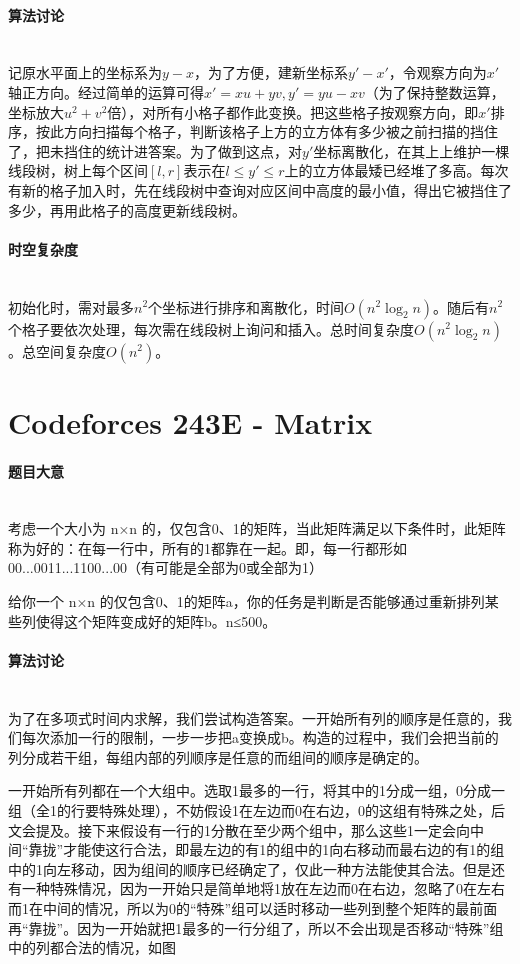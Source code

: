 \documentclass[UTF8]{ctexart}
\newcommand{\myparagraph}[1]{\paragraph{#1}\mbox{}\\}
\theoremstyle{nonumberplain}
\begin{document}
		\myparagraph{算法讨论}
		
			记原水平面上的坐标系为$y-x$，为了方便，建新坐标系$y'-x'$，令观察方向为$x'$轴正方向。经过简单的运算可得$x'=xu+yv, y'=yu-xv$（为了保持整数运算，坐标放大$u^2+v^2$倍），对所有小格子都作此变换。把这些格子按观察方向，即$x'$排序，按此方向扫描每个格子，判断该格子上方的立方体有多少被之前扫描的挡住了，把未挡住的统计进答案。为了做到这点，对$y'$坐标离散化，在其上上维护一棵线段树，树上每个区间$[l,r]$表示在$l \leq y' \leq r$上的立方体最矮已经堆了多高。每次有新的格子加入时，先在线段树中查询对应区间中高度的最小值，得出它被挡住了多少，再用此格子的高度更新线段树。
		
		\myparagraph{时空复杂度}
		
			初始化时，需对最多$n^2$个坐标进行排序和离散化，时间$O(n^2\log_2n)$。随后有$n^2$个格子要依次处理，每次需在线段树上询问和插入。总时间复杂度$O(n^2\log_2n)$。总空间复杂度$O(n^2)$。
	
	\section{Codeforces 243E - Matrix}
	
		\myparagraph{题目大意}
		
			考虑一个大小为 n×n 的，仅包含0、1的矩阵，当此矩阵满足以下条件时，此矩阵称为好的：在每一行中，所有的1都靠在一起。即，每一行都形如00...0011...1100...00（有可能是全部为0或全部为1）
		
			给你一个 n×n 的仅包含0、1的矩阵a，你的任务是判断是否能够通过重新排列某些列使得这个矩阵变成好的矩阵b。n≤500。
			
		\myparagraph{算法讨论}
		
			为了在多项式时间内求解，我们尝试构造答案。一开始所有列的顺序是任意的，我们每次添加一行的限制，一步一步把a变换成b。构造的过程中，我们会把当前的列分成若干组，每组内部的列顺序是任意的而组间的顺序是确定的。
		
			一开始所有列都在一个大组中。选取1最多的一行，将其中的1分成一组，0分成一组（全1的行要特殊处理），不妨假设1在左边而0在右边，0的这组有特殊之处，后文会提及。接下来假设有一行的1分散在至少两个组中，那么这些1一定会向中间“靠拢”才能使这行合法，即最左边的有1的组中的1向右移动而最右边的有1的组中的1向左移动，因为组间的顺序已经确定了，仅此一种方法能使其合法。但是还有一种特殊情况，因为一开始只是简单地将1放在左边而0在右边，忽略了0在左右而1在中间的情况，所以为0的“特殊”组可以适时移动一些列到整个矩阵的最前面再“靠拢”。因为一开始就把1最多的一行分组了，所以不会出现是否移动“特殊”组中的列都合法的情况，如图
		
\end{document}
